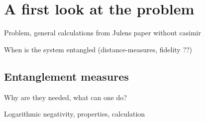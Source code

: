 \chapter{A first look at the problem}\label{cha:first-look}

Problem, general calculations from Julens paper without casimir

When is the system entangled (distance-measures, fidelity ??)


\section{Entanglement measures}
Why are they needed, what can one do?

Logarithmic negativity, properties, calculation
